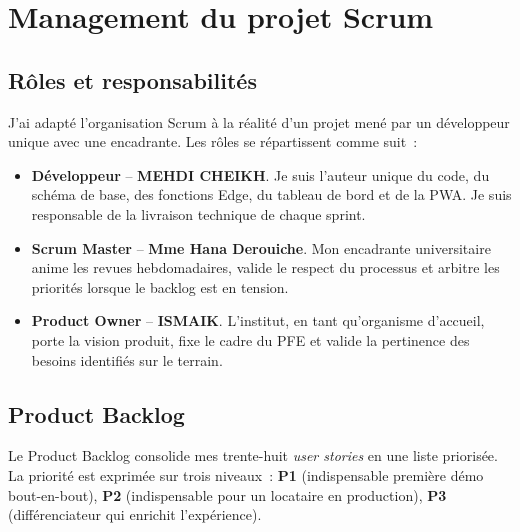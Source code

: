 \section{Management du projet Scrum}

\subsection{Rôles et responsabilités}
J'ai adapté l'organisation Scrum à la réalité d'un projet mené par
un développeur unique avec une encadrante. Les rôles se
répartissent comme suit~:
\begin{itemize}
  \item \textbf{Développeur} -- \textbf{MEHDI CHEIKH}. Je suis
        l'auteur unique du code, du schéma de base, des fonctions
        Edge, du tableau de bord et de la PWA. Je suis responsable
        de la livraison technique de chaque sprint.
  \item \textbf{Scrum Master} -- \textbf{Mme Hana Derouiche}.
        Mon encadrante universitaire anime les revues
        hebdomadaires, valide le respect du processus et arbitre
        les priorités lorsque le backlog est en tension.
  \item \textbf{Product Owner} -- \textbf{ISMAIK}. L'institut, en
        tant qu'organisme d'accueil, porte la vision produit, fixe
        le cadre du PFE et valide la pertinence des besoins
        identifiés sur le terrain.
\end{itemize}

\subsection{Product Backlog}
Le Product Backlog consolide mes trente-huit \emph{user stories} en
une liste priorisée. La priorité est exprimée sur trois niveaux~:
\textbf{P1} (indispensable première démo bout-en-bout), \textbf{P2}
(indispensable pour un locataire en production), \textbf{P3}
(différenciateur qui enrichit l'expérience).

